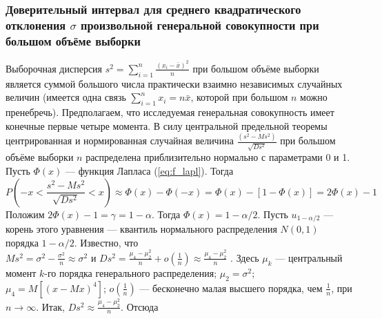\documentclass[main.tex]{subfiles}
\begin{document}
\subsubsection{Доверительный интервал для среднего квадратического отклонения $\sigma$ произвольной генеральной совокупности при большом объёме выборки}
Выборочная дисперсия $s^{2} = \sum_{i = 1}^{n}{\frac{(x_{i} - \bar{x})^{2}}{n}}$ при большом объёме выборки является суммой большого числа практически взаимно независимых случайных величин (имеется одна связь $\sum_{i=1}^{n}{x_{i}} = n\bar{x}$, которой при большом $n$ можно пренебречь). Предполагаем, что исследуемая генеральная совокупность имеет конечные первые четыре момента.
\newline
В силу центральной предельной теоремы центрированная и нормированная случайная величина $\frac{(s^{2}-Ms^{2})}{\sqrt{D s^{2}}}$ при большом объёме выборки $n$ распределена приблизительно нормально с параметрами 0 и 1. Пусть $\Phi(x)$ — функция Лапласа (\ref{eq:f_lapl}). Тогда
\begin{equation}
	P\left(-x < \frac{s^{2}-Ms^{2}}{\sqrt{D s^{2}}} < x\right)
	\approx \Phi(x) - \Phi(-x)=\Phi(x) - [1 - \Phi(x)] = 2\Phi(x) - 1
	\label{eq:P_as_sigma}
\end{equation}
Положим $2\Phi(x)-1 = \gamma = 1-\alpha$. Тогда $\Phi(x) = 1-\alpha/2$. Пусть
$u_{1-\alpha/2}$ — корень этого уравнения — квантиль нормального распределения
$N(0,1)$ порядка $1-\alpha/2$. Известно, что $Ms^{2} = \sigma^{2}
-\frac{\sigma^{2}}{n} \approx \sigma^{2} \text{ и } D s^{2} = \frac{\mu_{4}
-\mu_{2}^{2}}{n} + o(\frac{1}{n}) \approx \frac{\mu_{4} -\mu_{2}^{2}}{n}$ .
Здесь $\mu_{k}$ — центральный момент $k$-го порядка генерального распределения; $\mu_{2} = \sigma^{2}$; $\mu_{4} = M[(x-M x)^{4}]$︀; $o(\frac{1}{n})$ — бесконечно малая высшего порядка, чем $\frac{1}{n}$, при $n\rightarrow \infty$. Итак, $D s^{2} \approx \frac{\mu_{4} -\mu_{2}^{2}}{n}$. Отсюда
\end{document}
